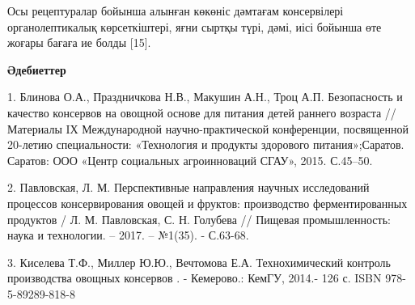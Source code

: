 
Осы рецептуралар бойынша алынған көкөніс дәмтағам консервілері
органолептикалық көрсеткіштері, яғни сыртқы түрі, дәмі, иісі бойынша өте
жоғары бағаға ие болды {[}15{]}.

{\bfseries Әдебиеттер}

1. Блинова О.А., Праздничкова Н.В., Макушин А.Н., Троц А.П. Безопасность
и качество консервов на овощной основе для питания детей раннего
возраста // Материалы IХ Международной научно-практической конференции,
посвященной 20-летию специальности: «Технология и продукты здорового
питания»;Саратов. Саратов: ООО «Центр социальных агроинноваций СГАУ»,
2015. С.45--50.

2. Павловская, Л. М. Перспективные направления научных исследований
процессов консервирования овощей и фруктов: производство
ферментированных продуктов / Л. М. Павловская, С. Н. Голубева // Пищевая
промышленность: наука и технологии. -- 2017. -- №1(35). - С.63-68.

3. Киселева Т.Ф., Миллер Ю.Ю., Вечтомова Е.А. Технохимический контроль
производства овощных консервов . - Кемерово.: КемГУ, 2014.- 126 с. ISBN
978-5-89289-818-8

